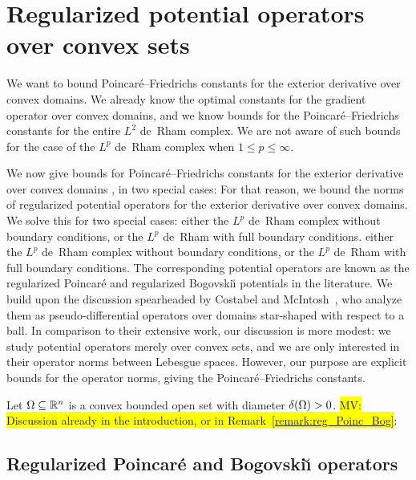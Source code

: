 \documentclass[10pt,letterpaper]{article}
\newcommand{\todo}[1]{{\colorbox{yellow}{#1}}}
\newcommand\cye[1]{%
\protect\leavevmode
\begingroup
    \color{red!35!yellow}%
    #1%
\endgroup
}
\newcommand{\mwl}[1]{{\color{red}#1}}
\begin{document}
\section{Regularized potential operators over convex sets}\label{section:potentialoperator}


We want to bound Poincar\'e--Friedrichs constants for the exterior derivative over convex domains.
We already know the optimal constants for the gradient operator over convex domains,
and we know bounds for the Poincar\'e--Friedrichs constants for the entire $L^{2}$ de~Rham complex. 
We are not aware of such bounds for the case of the $L^{p}$ de~Rham complex when $1 \leq p \leq \infty$. 

\mwl{We \cye{now give} bounds for Poincar\'e--Friedrichs constants for the exterior derivative over convex domains\cye{, in} two special cases:}
For that reason, we bound the norms of regularized potential operators for the exterior derivative over convex domains.
We solve this for two special cases: 
either the $L^{p}$ de~Rham complex without boundary conditions, 
or the $L^{p}$ de~Rham with full boundary conditions. 
either the $L^{p}$ de~Rham complex without boundary conditions, 
or the $L^{p}$ de~Rham with full boundary conditions. 
The corresponding potential operators are known as the regularized Poincar\'e and regularized Bogovski\u{\i} potentials in the literature. 
We build upon the discussion spearheaded by Costabel and McIntosh~\cite{costabel2010bogovskiui},
who analyze them as pseudo-differential operators over domains star-shaped with respect to a ball. 
% 
In comparison to their extensive work, our discussion is more modest:
we study potential operators merely over convex sets, and we are only interested in their operator norms between Lebesgue spaces.
However, our purpose are explicit bounds for the operator norms, giving the Poincar\'e--Friedrichs constants. 

Let $\Omega \subseteq {\mathbb R}^{n}$ is a convex bounded open set with diameter ${\delta}(\Omega) > 0$.
\todo{MV: Discussion already in the introduction, or in Remark~\ref{remark:reg_Poinc_Bog}}: 








\subsection{Regularized Poincar\'e and Bogovski\u{\i} operators}
\end{document}
